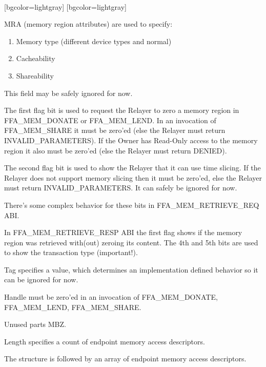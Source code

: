 \documentclass{article}
\begin{document}
\begin{bytefield}[bitwidth=1.4em]{32}
	\\
	[bgcolor=lightgray]{}
	[bgcolor=lightgray]{}
\end{bytefield}

MRA (memory region attributes) are used to specify:
\begin{enumerate}
    \item Memory type (different device types and normal)
    \item Cacheability
    \item Shareability 
\end{enumerate}

This field may be safely ignored for now.

The first flag bit is used to request the Relayer to zero a memory region in FFA\_MEM\_DONATE or FFA\_MEM\_LEND. In an invocation of FFA\_MEM\_SHARE it must be zero'ed (else the Relayer must return INVALID\_PARAMETERS). If the Owner has Read-Only access to the memory region it also must be zero'ed (else the Relayer must return DENIED).

The second flag bit is used to show the Relayer that it can use time slicing. If the Relayer does not support memory slicing then it must be zero'ed, else the Relayer must return INVALID\_PARAMETERS. It can safely be ignored for now.

There's some complex behavior for these bits in FFA\_MEM\_RETRIEVE\_REQ ABI.

In FFA\_MEM\_RETRIEVE\_RESP ABI the first flag shows if the memory region was retrieved with(out) zeroing its content. The 4th and 5th bits are used to show the transaction type (important!). 

Tag specifies a value, which determines an implementation defined behavior so it can be ignored for now.

Handle must be zero'ed in an invocation of FFA\_MEM\_DONATE, FFA\_MEM\_LEND, FFA\_MEM\_SHARE.

Unused parts MBZ.

Length specifies a count of endpoint memory access descriptors.

The structure is followed by an array of endpoint memory access descriptors.
\end{document}
